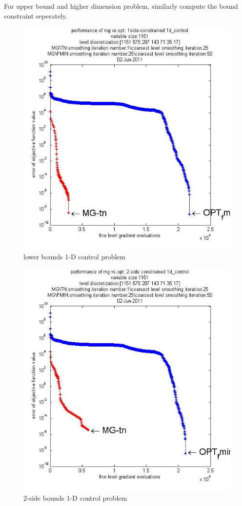 \documentclass[10pt]{article}
\begin{document}
\begin{itemize}
For upper bound and higher dimension problem, similarly compute the bound constraint seperately. 

\begin{figure}[h]
\centering
  \includegraphics[width=1.0\textwidth]{finalplot11511s.jpg}
  \caption{lower bounds 1-D control problem}
\label{fig:1dcontroll}
\end{figure}

\begin{figure}[h]
\centering
  \includegraphics[width=1.0\textwidth]{goodplot11512s.jpg}
  \caption{2-side bounds 1-D control problem}
\label{fig:1dcontrol2}
\end{figure}


\end{itemize}
\end{document}
